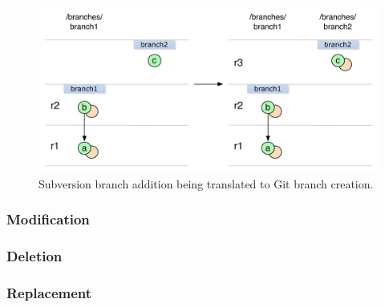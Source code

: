 \begin{figure}[!h]
\centering
\renewcommand{\figurename}{Diagram}
\includegraphics[width=\linewidth]{img/diagrams/branch_creation_no_history_git_to_svn.pdf}
\caption{Subversion branch addition being translated to Git branch creation.}
\label{branch_creation_no_history_git_to_svn}
\end{figure}

\subsubsection{Modification}

\subsubsection{Deletion}

\subsubsection{Replacement}
